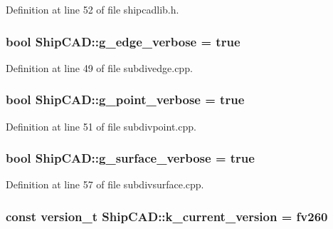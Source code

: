 Definition at line 52 of file shipcadlib.\+h.

\subsubsection[{\texorpdfstring{g\+\_\+edge\+\_\+verbose}{g_edge_verbose}}]{\setlength{\rightskip}{0pt plus 5cm}bool Ship\+C\+A\+D\+::g\+\_\+edge\+\_\+verbose = true}\hypertarget{namespaceShipCAD_ad5a157bd082e37a863f05b7c54a1d7cc}{}\label{namespaceShipCAD_ad5a157bd082e37a863f05b7c54a1d7cc}


Definition at line 49 of file subdivedge.\+cpp.

\subsubsection[{\texorpdfstring{g\+\_\+point\+\_\+verbose}{g_point_verbose}}]{\setlength{\rightskip}{0pt plus 5cm}bool Ship\+C\+A\+D\+::g\+\_\+point\+\_\+verbose = true}\hypertarget{namespaceShipCAD_ae059a88fbc18c56ceee2fd1cd7f2aad0}{}\label{namespaceShipCAD_ae059a88fbc18c56ceee2fd1cd7f2aad0}


Definition at line 51 of file subdivpoint.\+cpp.

\subsubsection[{\texorpdfstring{g\+\_\+surface\+\_\+verbose}{g_surface_verbose}}]{\setlength{\rightskip}{0pt plus 5cm}bool Ship\+C\+A\+D\+::g\+\_\+surface\+\_\+verbose = true}\hypertarget{namespaceShipCAD_a45538d3cd2c9293bf0bd4b09a23670ac}{}\label{namespaceShipCAD_a45538d3cd2c9293bf0bd4b09a23670ac}


Definition at line 57 of file subdivsurface.\+cpp.

\subsubsection[{\texorpdfstring{k\+\_\+current\+\_\+version}{k_current_version}}]{\setlength{\rightskip}{0pt plus 5cm}const {\bf version\+\_\+t} Ship\+C\+A\+D\+::k\+\_\+current\+\_\+version = {\bf fv260}}\hypertarget{namespaceShipCAD_aa3415e1acf9bdb19e24f31f5138d6a60}{}\label{namespaceShipCAD_aa3415e1acf9bdb19e24f31f5138d6a60}


